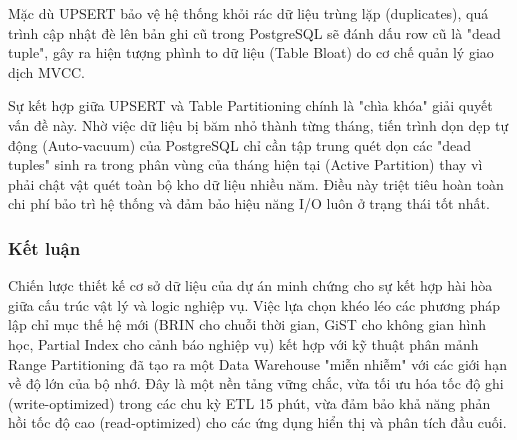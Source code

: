 Mặc dù UPSERT bảo vệ hệ thống khỏi rác dữ liệu trùng lặp (duplicates), quá trình cập nhật đè lên bản ghi cũ trong PostgreSQL sẽ đánh dấu row cũ là "dead tuple", gây ra hiện tượng phình to dữ liệu (Table Bloat) do cơ chế quản lý giao dịch MVCC.


Sự kết hợp giữa UPSERT và Table Partitioning chính là "chìa khóa" giải quyết vấn đề này. Nhờ việc dữ liệu bị băm nhỏ thành từng tháng, tiến trình dọn dẹp tự động (Auto-vacuum) của PostgreSQL chỉ cần tập trung quét dọn các "dead tuples" sinh ra trong phân vùng của tháng hiện tại (Active Partition) thay vì phải chật vật quét toàn bộ kho dữ liệu nhiều năm. Điều này triệt tiêu hoàn toàn chi phí bảo trì hệ thống và đảm bảo hiệu năng I/O luôn ở trạng thái tốt nhất.


\subsubsection{Kết luận}
Chiến lược thiết kế cơ sở dữ liệu của dự án minh chứng cho sự kết hợp hài hòa giữa cấu trúc vật lý và logic nghiệp vụ. Việc lựa chọn khéo léo các phương pháp lập chỉ mục thế hệ mới (BRIN cho chuỗi thời gian, GiST cho không gian hình học, Partial Index cho cảnh báo nghiệp vụ) kết hợp với kỹ thuật phân mảnh Range Partitioning đã tạo ra một Data Warehouse "miễn nhiễm" với các giới hạn về độ lớn của bộ nhớ. Đây là một nền tảng vững chắc, vừa tối ưu hóa tốc độ ghi (write-optimized) trong các chu kỳ ETL 15 phút, vừa đảm bảo khả năng phản hồi tốc độ cao (read-optimized) cho các ứng dụng hiển thị và phân tích đầu cuối.
